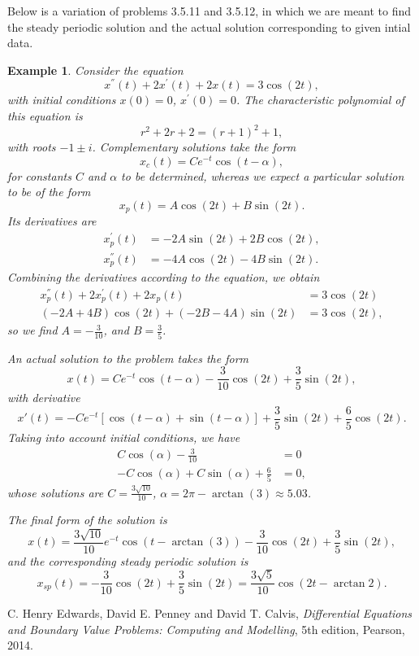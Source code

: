 \documentclass[11pt]{amsart}
\newtheorem{example}{Example}
\numberwithin{equation}{section}
\begin{document}
Below is a variation of problems 3.5.11 and 3.5.12, in which we are meant to find the steady periodic solution and the actual solution corresponding to given intial data.
\begin{example}
Consider the equation
\begin{equation*}
x^{''}(t)+2x^{'}(t)+2x(t) = 3\cos(2t),
\end{equation*}
with initial conditions $x(0)=0$, $x^{'}(0)=0$. The characteristic polynomial of this equation is 
\begin{equation*}
r^2+2r+2=(r+1)^2+1,
\end{equation*}
with roots $-1\pm i$. Complementary solutions take the form
\begin{equation*}
x_{c}(t)=Ce^{-t}\cos(t-\alpha),
\end{equation*}
for constants $C$ and $\alpha$ to be determined, whereas we expect a particular solution to be of the form 
\begin{equation*}
x_p(t)=A\cos(2t)+B\sin(2t).
\end{equation*}
Its derivatives are 
\begin{align*}
x_{p}^{'}(t) & = -2A\sin(2t)+2B\cos(2t), \\
x_{p}^{''}(t) & = -4A\cos(2t)-4B\sin(2t).
\end{align*}
Combining the derivatives according to the equation, we obtain 
\begin{align*}
x_{p}^{''}(t)+2x_{p}^{'}(t)+2x_p(t) & =  3\cos(2t) \\
(-2A+4B)\cos(2t)+(-2B-4A)\sin(2t) & =  3\cos(2t),
\end{align*}
so we find $A=-\frac{3}{10}$, and $B=\frac{3}{5}$. 

An actual solution to the problem takes the form
\begin{equation*}
x(t)=Ce^{-t}\cos(t-\alpha)-\frac{3}{10}\cos(2t)+\frac{3}{5}\sin(2t),
\end{equation*}
with derivative
\begin{equation*}
x'(t)=-Ce^{-t}[\cos(t-\alpha)+\sin(t-\alpha)]+\frac{3}{5}\sin(2t)+\frac{6}{5}\cos(2t).
\end{equation*}
Taking into account initial conditions, we have 
\begin{align*}
C\cos(\alpha) - \frac{3}{10} & = 0 \\
-C\cos(\alpha)+C\sin(\alpha)+\frac{6}{5} & = 0,
\end{align*}
whose solutions are $C=\frac{3\sqrt{10}}{10}$, $\alpha =2\pi-\arctan(3) \approx 5.03$. 

The final form of the solution is 
\begin{equation*}
x(t)=\frac{3\sqrt{10}}{10}e^{-t}\cos(t-\arctan(3)) -\frac{3}{10}\cos(2t)+\frac{3}{5}\sin(2t),
\end{equation*}
and the corresponding steady periodic solution is 
\begin{equation*}
x_{sp}(t) =  -\frac{3}{10}\cos(2t)+\frac{3}{5}\sin(2t) = \frac{3\sqrt{5}}{10}\cos(2t-\arctan{2}).
\end{equation*}
\end{example}
\begin{thebibliography}{0}

 C. Henry Edwards, David E. Penney and David T. Calvis, {\it Differential Equations and Boundary Value Problems: Computing and Modelling}, 5th edition, Pearson, 2014.

\end{thebibliography}
\end{document}
